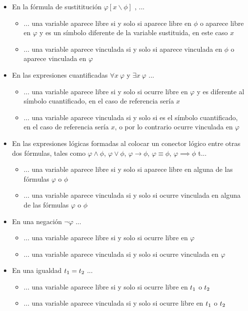 \begin{itemize}
	\item{En la fórmula de sustititución $\varphi\left[x \backslash \phi\right]$ , } ...
		\begin{itemize}
			\item{... una variable aparece libre si y solo si aparece libre en $\phi$ o aparece libre en $\varphi$ y es un símbolo diferente de la variable sustituida, en este caso $x$}
			\item{... una variable aparece vinculada si y solo si aparece vinculada en $\phi$ o aparece vinculada en $\varphi$ }
		\end{itemize}
	\item{En las expresiones cuantificadas $\forall x\ \varphi$ y $\exists x\ \varphi$ ...}
		\begin{itemize}
			\item{... una variable aparece libre si y solo si ocurre libre en $\varphi$ y es diferente al símbolo cuantificado, en el caso de referencia sería $x$}
			\item{... una variable aparece vinculada si  y solo si es el símbolo cuantificado, en el caso de referencia sería $x$, o por lo contrario ocurre vinculada en $\varphi$}
		\end{itemize}
	\item{En las expresiones lógicas formadas al colocar un conector lógico  entre otras dos fórmulas, tales como $\varphi \land \phi$, $\varphi \lor \phi$, $\varphi \to \phi$, $\varphi \equiv \phi$, $\varphi \implies \phi$ t...}
		\begin{itemize}
			\item{... una variable aparece libre si y solo si aparece libre en alguna de las fórmulas $\varphi$ o $\phi$}
			\item{... una variable aparece vinculada si  y solo si ocurre vinculada en alguna de las fórmulas $\varphi$ o $\phi$}
		\end{itemize}
	\item{En una negación $\neg\varphi$ ...}
		\begin{itemize}
			\item{... una variable aparece libre si y solo si ocurre libre en $\varphi$}
			\item{... una variable aparece vinculada si  y solo si ocurre vinculada en $\varphi$}
		\end{itemize}
	\item{En una igualdad $t\textsubscript{1}=t\textsubscript{2}$ ...}
		\begin{itemize}
			\item{... una variable aparece libre si y solo si ocurre libre en $t\textsubscript{1}$ o $t\textsubscript{2}$ }
			\item{... una variable aparece vinculada si  y solo si ocurre libre en $t\textsubscript{1}$ o $t\textsubscript{2}$ }
		\end{itemize}
	

\end{itemize}
